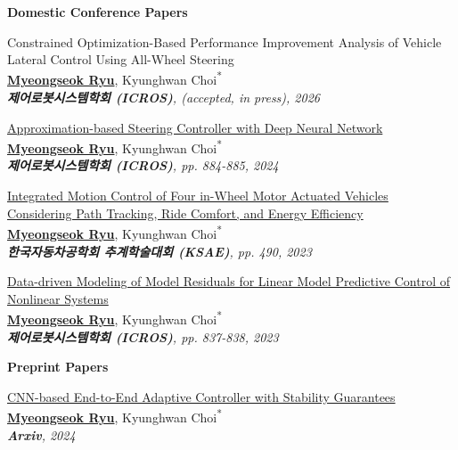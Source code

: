 \footnotesize{\textbf{Domestic Conference Papers}

\begin{etaremune}

    \item {
        Constrained Optimization-Based Performance Improvement Analysis of Vehicle Lateral Control Using All-Wheel Steering
        \\
        \textbf{\underline{Myeongseok Ryu}}, Kyunghwan Choi\textsuperscript{{*}}
        \\
        \textit{
            \textbf{제어로봇시스템학회 (ICROS)}, (accepted, in press), 2026
        }
    }

    \item {
        \href{https://www.dbpia.co.kr/journal/articleDetail?nodeId=NODE11909146}{Approximation-based Steering Controller with Deep Neural Network}
        \\
        \textbf{\underline{Myeongseok Ryu}}, Kyunghwan Choi\textsuperscript{{*}}
        \\
        \textit{
            \textbf{제어로봇시스템학회 (ICROS)}, pp. 884-885, 2024
        }
    }

    \item {
        \href{https://www.dbpia.co.kr/journal/articleDetail?nodeId=NODE11665897}{Integrated Motion Control of Four in-Wheel Motor Actuated Vehicles Considering Path Tracking, Ride Comfort, and Energy Efficiency}
        \\
        \textbf{\underline{Myeongseok Ryu}}, Kyunghwan Choi\textsuperscript{{*}}
        \\
        \textit{
            \textbf{한국자동차공학회 추계학술대회 (KSAE)}, pp. 490, 2023
        }
    }

    \item {
        \href{https://www.dbpia.co.kr/journal/articleDetail?nodeId=NODE11480596}{Data-driven Modeling of Model Residuals for Linear Model Predictive Control of Nonlinear Systems}
        \\
        \textbf{\underline{Myeongseok Ryu}}, Kyunghwan Choi\textsuperscript{{*}}
        \\
        \textit{
            \textbf{제어로봇시스템학회 (ICROS)}, pp. 837-838, 2023
        }
    }

\end{etaremune}}
    
\footnotesize{\textbf{Preprint Papers}

\begin{etaremune}

    \item {
        \href{https://doi.org/10.48550/arXiv.2403.03499}{CNN-based End-to-End Adaptive Controller with Stability Guarantees}
        \\
        \textbf{\underline{Myeongseok Ryu}}, Kyunghwan Choi\textsuperscript{{*}}
        \\
        \textit{
            \textbf{Arxiv}, 2024
        }
    }

\end{etaremune}}
    